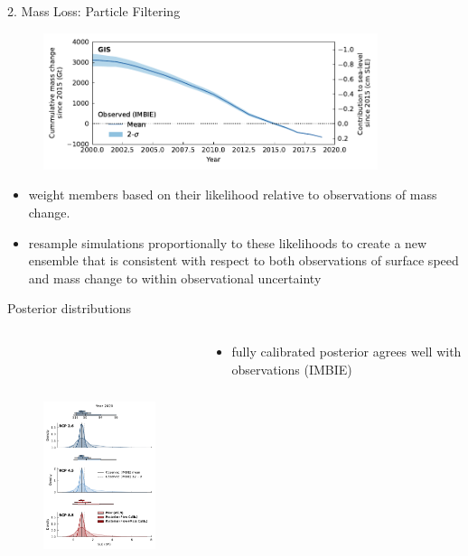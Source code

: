 \documentclass[hide notes,intlimits]{beamer}
\begin{document}
\begin{frame}{2. Mass Loss: Particle Filtering}
  \begin{minipage}[t][4cm][t]{\textwidth}
    \begin{figure}
    \includegraphics[height=4cm]{GIS_hist_only_obs}
    \end{figure}
  \end{minipage}
  \begin{itemize}
  \item  weight members based on their likelihood relative to observations of mass change.
  \item resample simulations proportionally to these likelihoods to create a new ensemble that is consistent with respect to both  observations of surface speed and mass change to within observational uncertainty
  \end{itemize}
\end{frame}


\begin{frame}{Posterior distributions}
\begin{columns}[c]
    \begin{column}{.5\textwidth}
    \begin{figure}
      \includegraphics[height=7.75cm]{sle_pdf_w_obs_calibrated_2020.pdf}
    \end{figure}
    \end{column}
    \begin{column}{.5\textwidth}
  \begin{itemize}
  \item fully calibrated posterior agrees well with observations (IMBIE)
    \end{itemize}
    \end{column}
  \end{columns}
 \end{frame}
\end{document}
